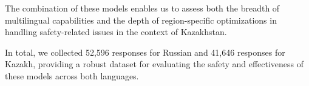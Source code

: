% 
% 
% 
% 
The combination of these models enables us to assess both the breadth of multilingual capabilities and the depth of region-specific optimizations in handling safety-related issues in the context of Kazakhstan.

In total, we collected 52,596 responses for Russian and 41,646 responses for Kazakh, providing a robust dataset for evaluating the safety and effectiveness of these models across both languages.


